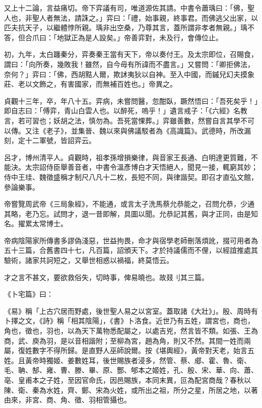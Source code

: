 \begin{pinyinscope}
 又上十二論，言益痛切。帝下弈議有司，唯道源佐其請。中書令蕭瑀曰：「佛，聖人也，非聖人者無法，請誅之。」弈曰：「禮，始事親，終事君。而佛逃父出家，以匹夫抗天子，以繼體悖所親。瑀非出空桑，乃尊其言，蓋所謂非孝者無親。」瑀不答，但合爪曰：「地獄正為是人設矣。」帝善弈對，未及行，會傳位止。



 初，九年，太白躔秦分，弈奏秦王當有天下，帝以奏付王。及太宗即位，召賜食，謂曰：「向所奏，幾敗我！雖然，自今毋有所諱而不盡言。」又嘗問：「卿拒佛法，奈何？」弈曰：「佛，西胡黠人爾，欺訹夷狄以自神。至入中國，而鏚兒幻夫摸象莊、老以文飾之，有害國家，而無補百姓也。」帝異之。



 貞觀十三年，卒，年八十五。弈病，未嘗問醫，忽酣臥，蹶然悟曰：「吾死矣乎！」即自志曰：「傅弈，青山白雲人也。以醉死，嗚乎！」遺言戒子：「《六經》名教言，若可習也；妖胡之法，慎勿為。吾死當惈葬。」弈雖善數，然嘗自言其學不可以傳。又注《老子》，並集晉、魏以來與佛議駁者為《高識篇》。武德時，所改漏刻，定十二軍號，皆詔弈云。



 呂才，博州清平人。貞觀時，祖孝孫增損樂律，與音家王長通、白明達更質難，不能決。太宗詔侍臣舉善音者，中書令溫彥博白才天悟絕人，聞見一接，輒窮其妙；侍中王珪、魏徵盛稱才制尺八凡十二枚，長短不同，與律諧契。即召才直弘文館，參論樂事。



 帝嘗覽周武帝《三局象經》，不能通，或言太子洗馬蔡允恭能之，召問允恭，少通其略，老乃忘。試問才，退一昔即解，具圖以聞。允恭記其舊，與才正同，由是知名。擢累太常博士。



 帝病陰陽家所傳書多謬偽淺惡，世益拘畏，命才與宿學老師刪落煩訛，掇可用者為五十三篇，合舊書四十七，凡百篇，詔頒天下。才於持議儒而不俚，以經誼推處其驗術，諸家共訶短之，又舉世相惑以禍福，終莫悟云。



 才之言不甚文，要欲救俗失，切時事，俾易曉也。故叕刂其三篇。



 《卜宅篇》曰：



 《易》稱「上古穴居而野處，後世聖人易之以宮室。蓋取諸《大壯》」。殷、周時有卜擇之文，《詩》稱「相其陰陽」，《書》卜洛食。近世乃有五姓，謂宮也，商也，角也，徵也，羽也，以為天下萬物悉配屬之，以處吉兇，然言皆不類。如張、王為商，武、庾為羽，是以音相諧附；至柳為宮，趙為角，則又不然。其間一姓而兩屬，復姓數字不得所歸。是直野人巫師說爾。按《堪輿經》，黃帝對天老，始言五姓。且黃帝時獨姬、姜數姓耳，後世賜族者浸多，然管、蔡、郕、霍、魯、衛、毛、聃、郜、雍、曹、滕、畢、原、酆、郇本之姬姓，孔、殷、宋、華、向、蕭、亳、皇甫本之子姓，至因官命氏，因邑賜族，本同末異，叵為配宮商哉？春秋以陳、衛、秦為水姓，齊、鄭、宋為火姓，或所出之祖，所分之星，所居之地，以著由來，非宮、商、角、徵、羽相管攝也。




\end{pinyinscope}
